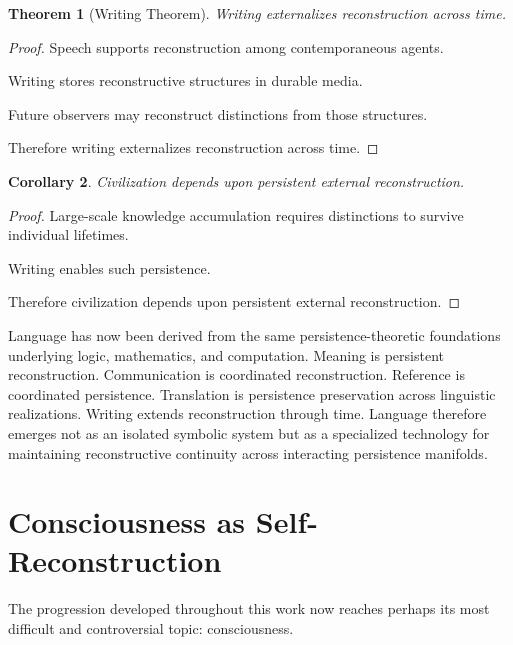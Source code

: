 \documentclass[12pt,oneside]{article}
\newtheorem{theorem}{Theorem}[section] \newtheorem{lemma}[theorem]{Lemma} \newtheorem{proposition}[theorem]{Proposition} \newtheorem{corollary}[theorem]{Corollary}
\theoremstyle{definition}
\begin{document}
\begin{theorem}[Writing Theorem]

Writing externalizes reconstruction across time.

\end{theorem}

\begin{proof}

Speech supports reconstruction among contemporaneous agents.

Writing stores reconstructive structures in durable media.

Future observers may reconstruct distinctions from those structures.

Therefore writing externalizes reconstruction across time.

\end{proof}

\begin{corollary}

Civilization depends upon persistent external reconstruction.

\end{corollary}

\begin{proof}

Large-scale knowledge accumulation requires distinctions to survive individual lifetimes.

Writing enables such persistence.

Therefore civilization depends upon persistent external reconstruction.

\end{proof}

Language has now been derived from the same persistence-theoretic foundations underlying logic, mathematics, and computation. Meaning is persistent reconstruction. Communication is coordinated reconstruction. Reference is coordinated persistence. Translation is persistence preservation across linguistic realizations. Writing extends reconstruction through time. Language therefore emerges not as an isolated symbolic system but as a specialized technology for maintaining reconstructive continuity across interacting persistence manifolds.

\section{Consciousness as Self-Reconstruction}

The progression developed throughout this work now reaches perhaps its most difficult and controversial topic: consciousness.
\end{document}
